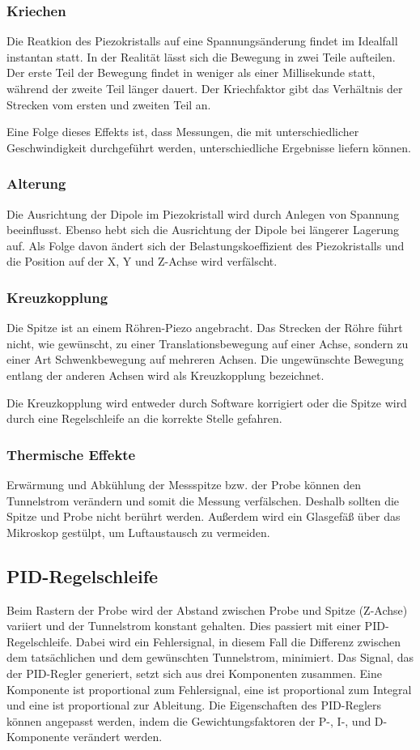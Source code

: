 \subsubsection{Kriechen}
Die Reatkion des Piezokristalls auf eine Spannungsänderung findet im Idealfall instantan statt.
In der Realität lässt sich die Bewegung in zwei Teile aufteilen.
Der erste Teil der Bewegung findet in weniger als einer Millisekunde statt, während der zweite Teil länger dauert.
Der Kriechfaktor gibt das Verhältnis der Strecken vom ersten und zweiten Teil an.

Eine Folge dieses Effekts ist, dass Messungen, die mit unterschiedlicher Geschwindigkeit durchgeführt werden, unterschiedliche Ergebnisse liefern können.

\subsubsection{Alterung}
Die Ausrichtung der Dipole im Piezokristall wird durch Anlegen von Spannung beeinflusst.
Ebenso hebt sich die Ausrichtung der Dipole bei längerer Lagerung auf.
Als Folge davon ändert sich der Belastungskoeffizient des Piezokristalls und die Position auf der X, Y und Z-Achse wird verfälscht.

\subsubsection{Kreuzkopplung}

Die Spitze ist an einem Röhren-Piezo angebracht.
Das Strecken der Röhre führt nicht, wie gewünscht, zu einer Translationsbewegung auf einer Achse, sondern zu einer Art Schwenkbewegung auf mehreren Achsen.
Die ungewünschte Bewegung entlang der anderen Achsen wird als Kreuzkopplung bezeichnet.

Die Kreuzkopplung wird entweder durch Software korrigiert oder die Spitze wird durch eine Regelschleife an die korrekte Stelle gefahren.

\subsubsection{Thermische Effekte}
Erwärmung und Abkühlung der Messspitze bzw. der Probe können den Tunnelstrom verändern und somit die Messung verfälschen.
Deshalb sollten die Spitze und Probe nicht berührt werden.
Außerdem wird ein Glasgefäß über das Mikroskop gestülpt, um Luftaustausch zu vermeiden.

\subsection{PID-Regelschleife}
Beim Rastern der Probe wird der Abstand zwischen Probe und Spitze (Z-Achse) variiert und der Tunnelstrom konstant gehalten.
Dies passiert mit einer PID-Regelschleife.
Dabei wird ein Fehlersignal, in diesem Fall die Differenz zwischen dem tatsächlichen und dem gewünschten Tunnelstrom, minimiert.
Das Signal, das der PID-Regler generiert, setzt sich aus drei Komponenten zusammen. Eine Komponente ist proportional zum Fehlersignal, eine ist proportional zum Integral und eine ist proportional zur Ableitung.
Die Eigenschaften des PID-Reglers können angepasst werden, indem die Gewichtungsfaktoren der P-, I-, und D-Komponente verändert werden.